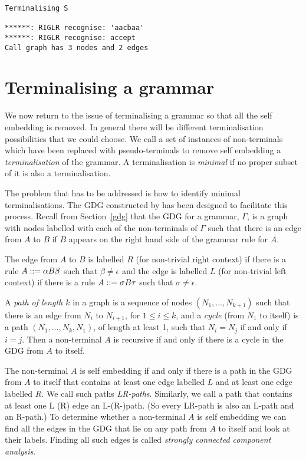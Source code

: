 {\small
\begin{verbatim}
Terminalising S

******: RIGLR recognise: 'aacbaa'
******: RIGLR recognise: accept
Call graph has 3 nodes and 2 edges
\end{verbatim}
}%


\section{Terminalising a grammar}

We now return to the issue of terminalising a grammar so that all the
self embedding is removed. 
In general there will be different terminalisation possibilities that 
we could choose. We call a set of instances of non-terminals
which have been replaced with pseudo-terminals to remove self
embedding a {\em terminalisation} of the grammar. A terminalisation 
is {\em minimal} if no proper subset of it is also a terminalisation.

The problem that has to be addressed is how to identify minimal 
terminalisations. The GDG constructed by \gtb has been designed to 
facilitate this process.
Recall from Section~\ref{gdg} that the GDG for a grammar, $\Gamma$, is
a graph with nodes labelled with each of the non-terminals of $\Gamma$
such that there is an edge from $A$ to $B$ if $B$ appears on the right
hand side of the grammar rule for $A$. 

The edge from $A$ to $B$ is labelled $R$ (for non-trivial right context) 
if there is a rule $A::=\alpha B\beta$ such that
$\beta\not=\epsilon$ and the edge is labelled $L$ 
(for non-trivial left context) if there is a rule 
$A::=\sigma B\tau$ such that $\sigma\not=\epsilon$. 

A {\em path of length $k$} in a graph is a sequence of nodes
$(N_1,\ldots,N_{k+1})$ such that there is an edge from $N_i$ to $N_{i+1}$,
for $1\leq i\leq k$, and a {\em cycle} (from $N_1$ to itself)
is a path $(N_1,\ldots, N_k, N_1)$, of length at least 1,
such that $N_i=N_j$ if and only if $i=j$.
Then a non-terminal $A$ is recursive if and only if there is a cycle
in the GDG from $A$ to itself.

The non-terminal
$A$ is self embedding if and only if there is a path in the GDG
from $A$ to itself that contains at least one edge labelled $L$ and at
least one edge labelled $R$. We call such paths 
{\em LR-paths}. Similarly, we call a path that contains at least one L
(R) edge an L-(R-)path. (So every LR-path is also an L-path and
an R-path.) To determine whether a non-terminal
$A$ is self embedding we can find all the edges in the GDG that lie on
any path from $A$ to itself and look at their labels.
Finding all such edges is called {\em strongly connected component
analysis}.

